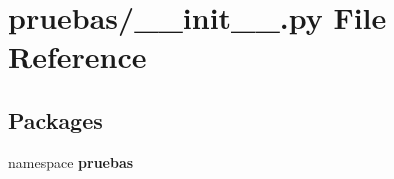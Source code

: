 \section{pruebas/\-\_\-\-\_\-init\-\_\-\-\_\-.py \-File \-Reference}
\label{pruebas_2____init_____8py}
\subsection*{\-Packages}
\begin{DoxyCompactItemize}
\item 
namespace {\bf pruebas}
\end{DoxyCompactItemize}
